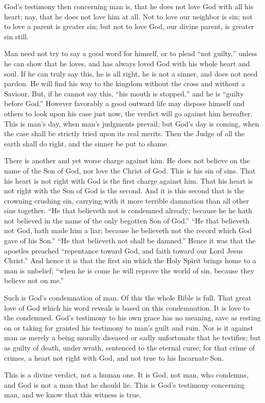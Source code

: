 \documentclass[
]{book}
\begin{document}
God's testimony then concerning man is, that he does not love God with all his heart; nay, that he does not love him at all. Not to love our neighbor is sin; not to love a parent is greater sin; but not to love God, our divine parent, is greater sin still.

Man need not try to say a good word for himself, or to plead ``not guilty,'' unless he can show that he loves, and has always loved God with his whole heart and soul. If he can truly say this, he is all right, he is not a sinner, and does not need pardon. He will find his way to the kingdom without the cross and without a Saviour. But, if he cannot say this, ``his mouth is stopped,'' and he is ``guilty before God.'' However favorably a good outward life may dispose himself and others to look upon his case just now, the verdict will go against him hereafter. This is man's day, when man's judgments prevail; but God's day is coming, when the case shall be strictly tried upon its real merits. Then the Judge of all the earth shall do right, and the sinner be put to shame.

There is another and yet worse charge against him. He does not believe on the name of the Son of God, nor love the Christ of God. This is his sin of sins. That his heart is not right with God is the first charge against him. That his heart is not right with the Son of God is the second. And it is this second that is the crowning crushing sin, carrying with it more terrible damnation than all other sins together. ``He that believeth not is condemned already; because he he hath not believed in the name of the only begotten Son of God.'' ``He that believeth not God, hath made him a liar; because he believeth not the record which God gave of his Son.'' ``He that believeth not shall be damned.'' Hence it was that the apostles preached ``repentance toward God, and faith toward our Lord Jesus Christ.'' And hence it is that the first sin which the Holy Spirit brings home to a man is unbelief; ``when he is come he will reprove the world of sin, because they believe not on me.''

Such is God's condemnation of man. Of this the whole Bible is full. That great love of God which his word reveals is based on this condemnation. It is love to the condemned. God's testimony to his own grace has no meaning, save as resting on or taking for granted his testimony to man's guilt and ruin. Nor is it against man as merely a being morally diseased or sadly unfortunate that he testifies; but as guilty of death, under wrath, sentenced to the eternal curse; for that crime of crimes, a heart not right with God, and not true to his Incarnate Son.

This is a divine verdict, not a human one. It is God, not man, who condemns, and God is not a man that he should lie. This is God's testimony concerning man, and we know that this witness is true.
\end{document}

